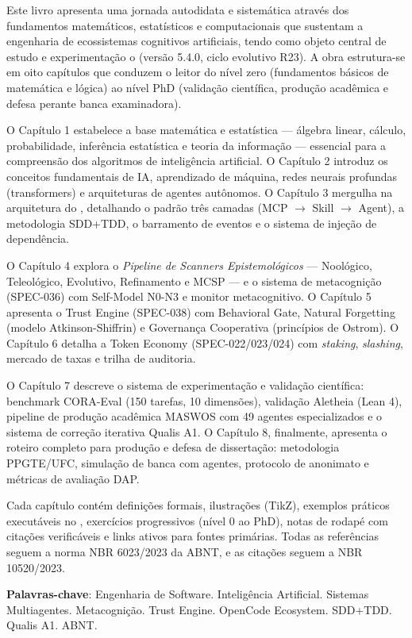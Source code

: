 \begin{resumo}

Este livro apresenta uma jornada autodidata e sistemática através dos fundamentos 
matemáticos, estatísticos e computacionais que sustentam a engenharia de 
ecossistemas cognitivos artificiais, tendo como objeto central de estudo e 
experimentação o \opencodeeco{} (versão 5.4.0, ciclo evolutivo R23). 
A obra estrutura-se em oito capítulos que conduzem o leitor do nível zero 
(fundamentos básicos de matemática e lógica) ao nível PhD (validação 
científica, produção acadêmica \qualisA{} e defesa perante banca examinadora).

O Capítulo 1 estabelece a base matemática e estatística --- álgebra linear, 
cálculo, probabilidade, inferência estatística e teoria da informação --- 
essencial para a compreensão dos algoritmos de inteligência artificial. 
O Capítulo 2 introduz os conceitos fundamentais de IA, aprendizado de máquina, 
redes neurais profundas (transformers) e arquiteturas de agentes autônomos. 
O Capítulo 3 mergulha na arquitetura do \opencodeeco, detalhando o padrão 
três camadas (MCP $\rightarrow$ Skill $\rightarrow$ Agent), a metodologia 
SDD+TDD, o barramento de eventos e o sistema de injeção de dependência.

O Capítulo 4 explora o \textit{Pipeline de Scanners Epistemológicos} --- 
Noológico, Teleológico, Evolutivo, Refinamento e MCSP --- e o sistema de 
metacognição (SPEC-036) com Self-Model N0-N3 e monitor metacognitivo. 
O Capítulo 5 apresenta o Trust Engine (SPEC-038) com Behavioral Gate, 
Natural Forgetting (modelo Atkinson-Shiffrin) e Governança Cooperativa 
(princípios de Ostrom). O Capítulo 6 detalha a Token Economy (SPEC-022/023/024) 
com \textit{staking}, \textit{slashing}, mercado de taxas e trilha de auditoria.

O Capítulo 7 descreve o sistema de experimentação e validação científica: 
benchmark CORA-Eval (150 tarefas, 10 dimensões), validação Aletheia 
(Lean 4), pipeline de produção acadêmica MASWOS com 49 agentes especializados 
e o sistema de correção iterativa Qualis A1. O Capítulo 8, finalmente, 
apresenta o roteiro completo para produção e defesa de dissertação: 
metodologia PPGTE/UFC, simulação de banca com agentes, protocolo de 
anonimato e métricas de avaliação DAP.

Cada capítulo contém definições formais, ilustrações (TikZ), exemplos 
práticos executáveis no \opencodeeco{}, exercícios progressivos (nível 0 
ao PhD), notas de rodapé com citações verificáveis e links ativos para 
fontes primárias. Todas as referências seguem a norma NBR 6023/2023 da 
ABNT, e as citações seguem a NBR 10520/2023.

\textbf{Palavras-chave}: Engenharia de Software. Inteligência Artificial. 
Sistemas Multiagentes. Metacognição. Trust Engine. OpenCode Ecosystem. 
SDD+TDD. Qualis A1. ABNT.

\end{resumo}
